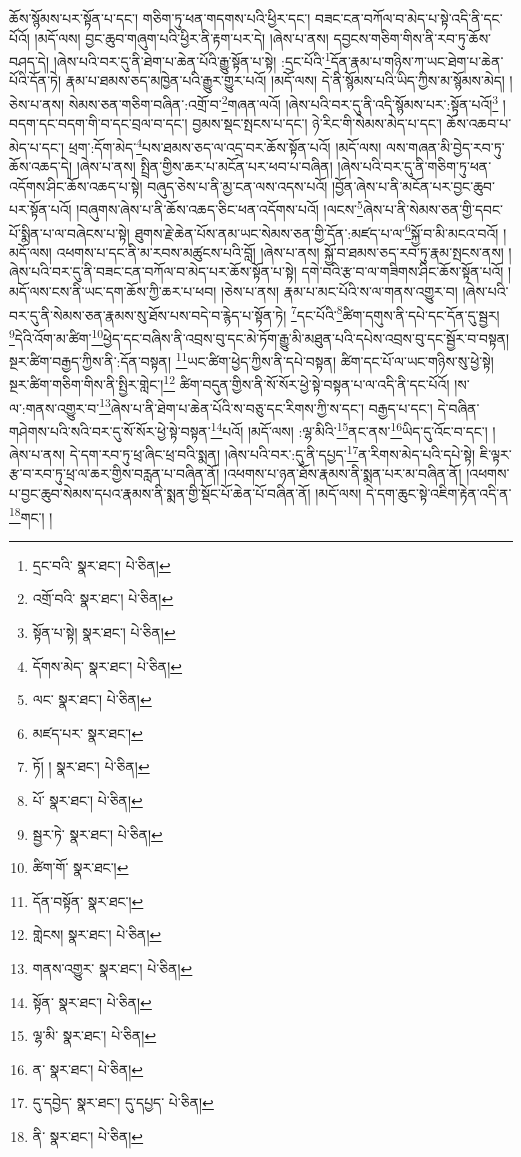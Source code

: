 ཆོས་སྙོམས་པར་སྟོན་པ་དང་། གཅིག་ཏུ་ཕན་གདགས་པའི་ཕྱིར་དང་། བཟང་ངན་བཀོལ་བ་མེད་པ་སྟེ་འདི་ནི་དང་པོའོ། །མདོ་ལས། བྱང་ཆུབ་གཞུག་པའི་ཕྱིར་ནི་རྟག་པར་དེ། །ཞེས་པ་ནས། དབྱངས་གཅིག་གིས་ནི་རབ་ཏུ་ཆོས་བཤད་དེ། །ཞེས་པའི་བར་དུ་ནི་ཐེག་པ་ཆེན་པོའི་རྒྱུ་སྟོན་པ་སྟེ། :དྲང་པོའི་\footnote{དྲང་བའི་  སྣར་ཐང་།  པེ་ཅིན། }དོན་རྣམ་པ་གཉིས་ཀ་ཡང་ཐེག་པ་ཆེན་པོའི་དོན་ཏེ། རྣམ་པ་ཐམས་ཅད་མཁྱེན་པའི་རྒྱུར་གྱུར་པའོ། །མདོ་ལས། དེ་ནི་སྙོམས་པའི་ཡིད་ཀྱིས་མ་སྙོམས་མེད། །ཅེས་པ་ནས། སེམས་ཅན་གཅིག་བཞིན་:འགྲོ་བ་\footnote{འགྲོ་བའི་  སྣར་ཐང་།  པེ་ཅིན། }གཞན་ལའོ། །ཞེས་པའི་བར་དུ་ནི་འདི་སྙོམས་པར་:སྟོན་པའོ།\footnote{སྟོན་པ་སྟེ།  སྣར་ཐང་།  པེ་ཅིན། } །བདག་དང་བདག་གི་བ་དང་བྲལ་བ་དང་། བྱམས་སྡང་སྤངས་པ་དང་། ཉེ་རིང་གི་སེམས་མེད་པ་དང་། ཆོས་འཆབ་པ་མེད་པ་དང་། ཕྲག་:དོག་མེད་\footnote{དོགས་མེད་  སྣར་ཐང་།  པེ་ཅིན། }པས་ཐམས་ཅད་ལ་འདྲ་བར་ཆོས་སྟོན་པའོ། །མདོ་ལས། ལས་གཞན་མི་བྱེད་རབ་ཏུ་ཆོས་འཆད་དེ། །ཞེས་པ་ནས། སྤྲིན་གྱིས་ཆར་པ་མངོན་པར་ཕབ་པ་བཞིན། །ཞེས་པའི་བར་དུ་ནི་གཅིག་ཏུ་ཕན་འདོགས་ཤིང་ཆོས་འཆད་པ་སྟེ། བཞུད་ཅེས་པ་ནི་མྱ་ངན་ལས་འདས་པའོ། །བྱོན་ཞེས་པ་ནི་མངོན་པར་བྱང་ཆུབ་པར་སྟོན་པའོ། །བཞུགས་ཞེས་པ་ནི་ཆོས་འཆད་ཅིང་ཕན་འདོགས་པའོ། །ལངས་\footnote{ལང་  སྣར་ཐང་།  པེ་ཅིན། }ཞེས་པ་ནི་སེམས་ཅན་གྱི་དབང་པོ་སྨིན་པ་ལ་བཞེངས་པ་སྟེ། ཐུགས་རྗེ་ཆེན་པོས་ནམ་ཡང་སེམས་ཅན་གྱི་དོན་:མཛད་པ་ལ་\footnote{མཛད་པར་  སྣར་ཐང་། }སྐྱོ་བ་མི་མངའ་བའོ། །མདོ་ལས། འཕགས་པ་དང་ནི་མ་རབས་མཚུངས་པའི་བློ། །ཞེས་པ་ནས། སྐྱོ་བ་ཐམས་ཅད་རབ་ཏུ་རྣམ་སྤངས་ནས། །ཞེས་པའི་བར་དུ་ནི་བཟང་ངན་བཀོལ་བ་མེད་པར་ཆོས་སྟོན་པ་སྟེ། དགེ་བའི་རྩ་བ་ལ་གཟིགས་ཤིང་ཆོས་སྟོན་པའོ། །མདོ་ལས་ངས་ནི་ཡང་དག་ཆོས་ཀྱི་ཆར་པ་ཕབ། །ཅེས་པ་ནས། རྣམ་པ་མང་པོའི་ས་ལ་གནས་འགྱུར་བ། །ཞེས་པའི་བར་དུ་ནི་སེམས་ཅན་རྣམས་སུ་ཐོས་པས་བདེ་བ་རྙེད་པ་སྟོན་ཏེ། \footnote{ཏོ། །  སྣར་ཐང་།  པེ་ཅིན། }དང་པོའི་\footnote{པོ་  སྣར་ཐང་།  པེ་ཅིན། }ཚིག་དགུས་ནི་དཔེ་དང་དོན་དུ་སྦྱར། \footnote{སྦྱར་ཏེ་  སྣར་ཐང་།  པེ་ཅིན། }དེའི་འོག་མ་ཚིག་\footnote{ཚིག་གོ་  སྣར་ཐང་། }ཕྱེད་དང་བཞིས་ནི་འབྲས་བུ་དང་མེ་ཏོག་རྒྱུ་མི་མཐུན་པའི་དཔེས་འབྲས་བུ་དང་སྦྱོར་བ་བསྟན། སྔར་ཚིག་བརྒྱད་ཀྱིས་ནི་:དོན་བསྟན། \footnote{དོན་བསྟོན་  སྣར་ཐང་། }ཡང་ཚིག་ཕྱེད་ཀྱིས་ནི་དཔེ་བསྟན། ཚིག་དང་པོ་ལ་ཡང་གཉིས་སུ་ཕྱེ་སྟེ། སྔར་ཚིག་གཅིག་གིས་ནི་སྤྱིར་གླེང་།\footnote{གླེངས།  སྣར་ཐང་།  པེ་ཅིན། } ཚིག་བདུན་གྱིས་ནི་སོ་སོར་ཕྱེ་སྟེ་བསྟན་པ་ལ་འདི་ནི་དང་པོའོ། །ས་ལ་:གནས་འགྱུར་བ་\footnote{གནས་འགྱུར་  སྣར་ཐང་།  པེ་ཅིན། }ཞེས་པ་ནི་ཐེག་པ་ཆེན་པོའི་ས་བཅུ་དང་རིགས་ཀྱི་ས་དང་། བརྒྱད་པ་དང་། དེ་བཞིན་གཤེགས་པའི་སའི་བར་དུ་སོ་སོར་ཕྱེ་སྟེ་བསྟན་\footnote{སྟོན་  སྣར་ཐང་།  པེ་ཅིན། }པའོ། །མདོ་ལས། :ལྷ་མིའི་\footnote{ལྷ་མི་  སྣར་ཐང་།  པེ་ཅིན། }ནང་ནས་\footnote{ན་  སྣར་ཐང་།  པེ་ཅིན། }ཡིད་དུ་འོང་བ་དང་། །ཞེས་པ་ནས། དེ་དག་རབ་ཏུ་ཕྲ་ཞིང་ཕྲ་བའི་སྨན། །ཞེས་པའི་བར་:དུ་ནི་དཔྱད་\footnote{དུ་དབྱེད་  སྣར་ཐང་། དུ་དཔྱད་  པེ་ཅིན། }ན་རིགས་མེད་པའི་དཔེ་སྟེ། ཇི་ལྟར་རྩ་བ་རབ་ཏུ་ཕྲ་ལ་ཆར་གྱིས་བརླན་པ་བཞིན་ནོ། །འཕགས་པ་ཉན་ཐོས་རྣམས་ནི་སྨན་པར་མ་བཞིན་ནོ། །འཕགས་པ་བྱང་ཆུབ་སེམས་དཔའ་རྣམས་ནི་སྨན་གྱི་སྡོང་པོ་ཆེན་པོ་བཞིན་ནོ། །མདོ་ལས། དེ་དག་ཆུང་སྟེ་འཇིག་རྟེན་འདི་ན་\footnote{ནི་  སྣར་ཐང་།  པེ་ཅིན། }གང་། །
